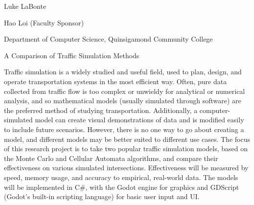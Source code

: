 Luke La\+Bonte

Hao Loi (Faculty Sponsor)

Department of Computer Science, Quinsigamond Community College

A Comparison of Traffic Simulation Methods

Traffic simulation is a widely studied and useful field, used to plan, design, and operate transportation systems in the most efficient way. Often, pure data collected from traffic flow is too complex or unwieldy for analytical or numerical analysis, and so mathematical models (usually simulated through software) are the preferred method of studying transportation. Additionally, a computer-\/simulated model can create visual demonstrations of data and is modified easily to include future scenarios. However, there is no one way to go about creating a model, and different models may be better suited to different use cases. The focus of this research project is to take two popular traffic simulation models, based on the Monte Carlo and Cellular Automata algorithms, and compare their effectiveness on various simulated intersections. Effectiveness will be measured by speed, memory usage, and accuracy to empirical, real-\/world data. The models will be implemented in C\#, with the Godot engine for graphics and GDScript (Godot’s built-\/in scripting language) for basic user input and UI. 